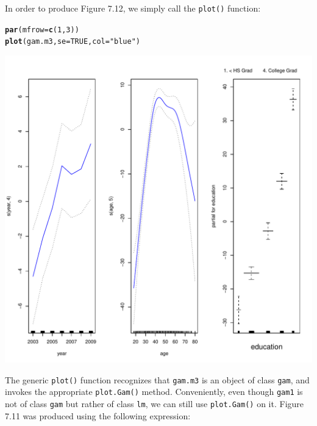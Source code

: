 \documentclass[12pt]{article}\usepackage[]{graphicx}\usepackage[]{color}
\makeatletter
\def\maxwidth{ %
  \ifdim\Gin@nat@width>\linewidth
    \linewidth
  \else
    \Gin@nat@width
  \fi
}
\newcommand{\hlnum}[1]{\textcolor[rgb]{0.686,0.059,0.569}{#1}}%
\newcommand{\hlstr}[1]{\textcolor[rgb]{0.192,0.494,0.8}{#1}}%
\newcommand{\hlstd}[1]{\textcolor[rgb]{0.345,0.345,0.345}{#1}}%
\newcommand{\hlkwc}[1]{\textcolor[rgb]{0.333,0.667,0.333}{#1}}%
\newcommand{\hlkwd}[1]{\textcolor[rgb]{0.737,0.353,0.396}{\textbf{#1}}}%
\newenvironment{kframe}{%
 \def\at@end@of@kframe{}%
 \ifinner\ifhmode%
  \def\at@end@of@kframe{\end{minipage}}%
  \begin{minipage}{\columnwidth}%
 \fi\fi%
 \def\FrameCommand##1{\hskip\@totalleftmargin \hskip-\fboxsep
 \colorbox{shadecolor}{##1}\hskip-\fboxsep
     \hskip-\linewidth \hskip-\@totalleftmargin \hskip\columnwidth}%
 \MakeFramed {\advance\hsize-\width
   \@totalleftmargin\z@ \linewidth\hsize
   \@setminipage}}%
 {\par\unskip\endMakeFramed%
 \at@end@of@kframe}
\newenvironment{knitrout}{}{} %
\makeatother
\begin{document}
In order to produce Figure 7.12, we simply call the \texttt{plot()} function:

\begin{knitrout}
\color{fgcolor}\begin{kframe}
\begin{alltt}
\hlkwd{par}\hlstd{(}\hlkwc{mfrow}\hlstd{=}\hlkwd{c}\hlstd{(}\hlnum{1}\hlstd{,}\hlnum{3}\hlstd{))}
\hlkwd{plot}\hlstd{(gam.m3,} \hlkwc{se}\hlstd{=}\hlnum{TRUE}\hlstd{,} \hlkwc{col}\hlstd{=}\hlstr{"blue"}\hlstd{)}
\end{alltt}
\end{kframe}
\includegraphics[width=\maxwidth]{figure/unnamed-chunk-25-1} 

\end{knitrout}

The generic \texttt{plot()} function recognizes that \texttt{gam.m3} is an object of class \texttt{gam}, and invokes the appropriate \texttt{plot.Gam()} method. Conveniently, even though \texttt{gam1} is not of class \texttt{gam} but rather of class \texttt{lm}, we can still use \texttt{plot.Gam()} on it. Figure 7.11 was produced using the following expression:
\end{document}
